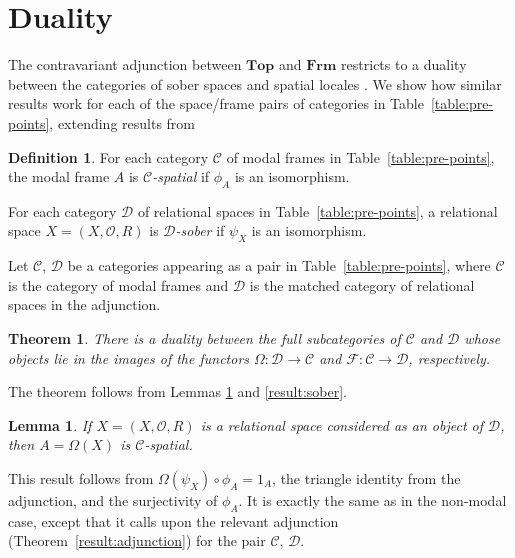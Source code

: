 \documentclass{article}[a4paper]
\newtheorem{theorem}{Theorem}%
\newtheorem{lemma}{Lemma}%
\theoremstyle{definition}
\newtheorem{definition}{Definition}%
\newcommand{\Ccal}{\mathcal{C}} %
\newcommand{\Dcal}{\mathcal{D}} %
\newcommand{\Ocal}{\mathcal{O}} %
\newcommand{\topcat}{\mathbf{Top}}
\newcommand{\frm}{\mathbf{Frm}}
\begin{document}
\section{Duality}
\label{sec:duality}

The contravariant adjunction between $\topcat$ and $\frm$ restricts to a duality between the categories of sober spaces and spatial locales \cite{stonespaces}. 
We show how similar results work for each of the space/frame pairs of categories in Table~\ref{table:pre-points}, extending results from \cite{hil00}%

\begin{definition}
For each category $\Ccal$ of modal frames in Table~\ref{table:pre-points}, the modal frame $A$ is \emph{$\Ccal$-spatial} if $\phi _A$ is an 
isomorphism.

For each category $\Dcal$ of relational spaces in Table~\ref{table:pre-points}, a relational space $X= (X,\Ocal ,R)$ is \emph{$\Dcal$-sober} if $\psi _X$ is an isomorphism.
\end{definition}

Let $\Ccal$, $\Dcal$ be a categories appearing as a pair in Table~\ref{table:pre-points}, where $\Ccal$ is the category of modal frames and $\Dcal$ is the matched category of relational spaces in the adjunction. 

\begin{theorem}
\label{pqdual}
There is a duality between the full subcategories of $\Ccal$ and 
$\Dcal$ whose objects lie in the images of the functors 
$\Omega      : \Dcal \longrightarrow \Ccal$ and
$\mathcal{F} : \Ccal \longrightarrow \Dcal$, respectively.
\end{theorem}

The theorem follows from Lemmas \ref{result:spatial} and \ref{result:sober}.

\begin{lemma}
\label{result:spatial}
If $X = (X , \Ocal , R)$ is a relational space considered as an object of $\Dcal$, then $A=\Omega (X)$ is $\Ccal$-spatial.
\end{lemma}

This result follows from $\Omega({\psi_X} ) \circ \phi _{A} = 1_{A}$, the triangle identity from the adjunction, and the surjectivity of $\phi _A$. It is exactly the same as in the non-modal case, except that it calls upon the relevant  adjunction (Theorem~\ref{result:adjunction}) for the pair $\Ccal$, $\Dcal$.
\end{document}

